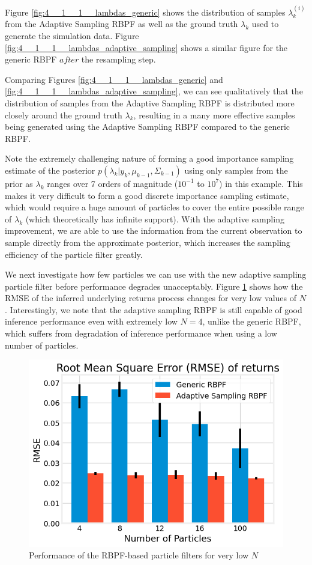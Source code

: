 \documentclass[../main.tex]{subfiles}
\begin{document}
Figure \ref{fig:4__1__1__lambdas_generic} shows the distribution of samples $\lambda_k^{(i)}$ from the Adaptive Sampling RBPF as well as the ground truth $\lambda_k$ used to generate the simulation data. 
Figure \ref{fig:4__1__1__lambdas_adaptive_sampling} shows a similar figure for the generic RBPF $\textit{after}$ the resampling step. 

Comparing Figures \ref{fig:4__1__1__lambdas_generic} and \ref{fig:4__1__1__lambdas_adaptive_sampling}, we can see qualitatively that the distribution of samples from the Adaptive Sampling RBPF is distributed more closely around the ground truth $\lambda_k$, resulting in a many more effective samples being generated using the Adaptive Sampling RBPF compared to the generic RBPF.

Note the extremely challenging nature of forming a good importance sampling estimate of the posterior $p(\lambda_k | y_k, \mu_{k-1}, \Sigma_{k-1})$ using only samples from the prior as $\lambda_k$ ranges over 7 orders of magnitude ($10^{-1}$ to $10^7$) in this example. This makes it very difficult to form a good discrete importance sampling estimate, which would require a huge amount of particles to cover the entire possible range of $\lambda_k$ (which theoretically has infinite support). With the adaptive sampling improvement, we are able to use the information from the current observation to sample directly from the approximate posterior, which increases the sampling efficiency of the particle filter greatly. 

We next investigate how few particles we can use with the new adaptive sampling particle filter before performance degrades unacceptably. Figure \ref{fig:4__1__1__very_small_N} shows how the RMSE of the inferred underlying returns process changes for very low values of $N$. Interestingly, we note that the adaptive sampling RBPF is still capable of good inference performance even with extremely low $N = 4$, unlike the generic RBPF, which suffers from degradation of inference performance when using a low number of particles. 

\begin{figure}[h!]
	\centering
	\includegraphics[width=12.0cm]{../plots/4__1__1__very_small_N.png}
	\caption{Performance of the RBPF-based particle filters for very low $N$}
	\label{fig:4__1__1__very_small_N}
\end{figure}
	
\end{document}
